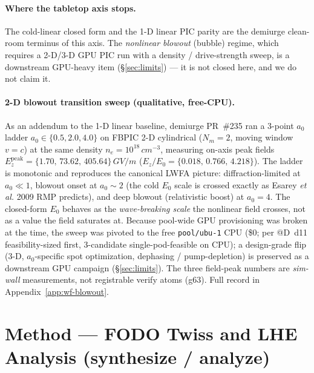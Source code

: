 \documentclass[11pt,a4paper]{article}
\begin{document}
\paragraph{Where the tabletop axis stops.} The cold-linear closed form
and the 1-D linear PIC parity are the demiurge clean-room terminus of
this axis. The \emph{nonlinear blowout} (bubble) regime, which requires a
2-D/3-D GPU PIC run with a density / drive-strength sweep, is a
downstream GPU-heavy item (\S\ref{sec:limits}) --- it is not closed here,
and we do not claim it.

\paragraph{2-D blowout transition sweep (qualitative, free-CPU).} As an
addendum to the 1-D linear baseline, demiurge PR~\#235 ran a 3-point
$a_0$ ladder $a_0\in\{0.5, 2.0, 4.0\}$ on FBPIC 2-D cylindrical
($N_m\!=\!2$, moving window $v\!=\!c$) at the same density
$n_e\!=\!10^{18}\,\si{cm^{-3}}$, measuring on-axis peak fields
$E_z^{\text{peak}}\!=\!\{1.70,\,73.62,\,405.64\}\,\si{GV/m}$
($E_z/E_0\!=\!\{0.018,\,0.766,\,4.218\}$). The ladder is monotonic and
reproduces the canonical LWFA picture: diffraction-limited at
$a_0\!\ll\!1$, blowout onset at $a_0\!\sim\!2$ (the cold $E_0$ scale is
crossed exactly as Esarey \emph{et al.} 2009 RMP predicts), and deep
blowout (relativistic boost) at $a_0\!=\!4$. The closed-form $E_0$
behaves as the \emph{wave-breaking scale} the nonlinear field crosses,
not as a value the field saturates at. Because pool-wide GPU
provisioning was broken at the time, the sweep was pivoted to the free
\texttt{pool/ubu-1} CPU (\$0; per @D~d11 feasibility-sized first,
3-candidate single-pod-feasible on CPU); a design-grade flip (3-D,
$a_0$-specific spot optimization, dephasing / pump-depletion) is
preserved as a downstream GPU campaign (\S\ref{sec:limits}). The three
field-peak numbers are \emph{sim-wall} measurements, not registrable
verify atoms (g63). Full record in Appendix~\ref{app:wf-blowout}.

\section{Method --- FODO Twiss and LHE Analysis (synthesize / analyze)}
\label{sec:fodo}
\end{document}
